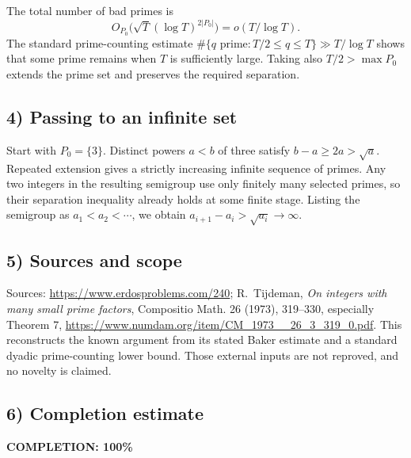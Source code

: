 The total number of bad primes is
\[
 O_{P_0}\bigl(\sqrt T(\log T)^{2|P_0|}\bigr)
       =o(T/\log T).
\]
The standard prime-counting estimate
$\#\{q\text{ prime}:T/2\leq q\leq T\}\gg T/\log T$
shows that some prime remains when $T$ is sufficiently large.
Taking also $T/2>\max P_0$ extends the prime set and preserves
the required separation.

\subsection{4) Passing to an infinite set}
Start with $P_0=\{3\}$. Distinct powers $a<b$ of three satisfy
$b-a\geq2a>\sqrt a$. Repeated extension gives a strictly increasing
infinite sequence of primes. Any two integers in the resulting
semigroup use only finitely many selected primes, so their
separation inequality already holds at some finite stage.
Listing the semigroup as $a_1<a_2<\cdots$, we obtain
$a_{i+1}-a_i>\sqrt{a_i}\to\infty$.

\subsection{5) Sources and scope}
Sources: \url{https://www.erdosproblems.com/240};
R.~Tijdeman, \emph{On integers with many small prime factors},
Compositio Math. 26 (1973), 319--330, especially Theorem 7,
\url{https://www.numdam.org/item/CM_1973__26_3_319_0.pdf}.
This reconstructs the known argument from its stated Baker
estimate and a standard dyadic prime-counting lower bound.
Those external inputs are not reproved, and no novelty is claimed.
\subsection{6) Completion estimate}
\textbf{COMPLETION: 100\%}
